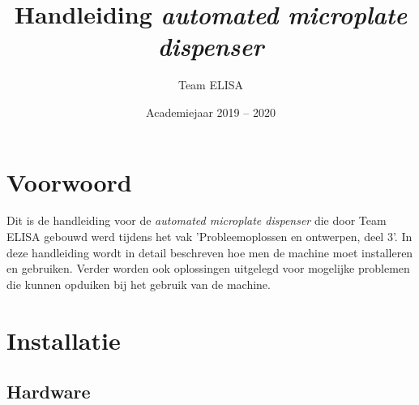 \documentclass[a4paper,twoside,kulak]{kulakreport} %
\title{Handleiding \textit{automated microplate dispenser}}
\author{Team ELISA}
\institute{Matthias Derez, Maxime Dujardin, Korneel Verkens, Seppe Vilain}
\date{Academiejaar 2019 -- 2020}
\begin{document}
	
	\titlepage
	

\chapter*{Voorwoord}


Dit is de handleiding voor de \textit{automated microplate dispenser} die door Team ELISA gebouwd werd tijdens het vak 'Probleemoplossen en ontwerpen, deel 3'. In deze handleiding wordt in detail beschreven hoe men de machine moet installeren en gebruiken. Verder worden ook oplossingen uitgelegd voor mogelijke problemen die kunnen opduiken bij het gebruik van de machine.




\chapter*{Installatie}
\section*{Hardware}
\label{sectie hardware}
\end{document}
